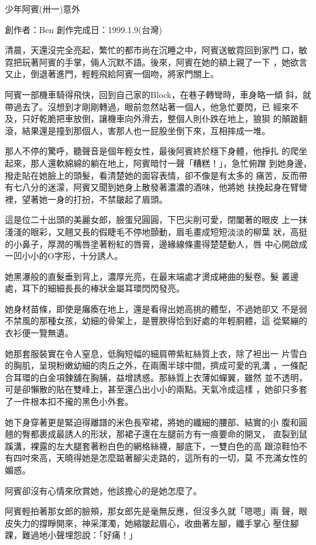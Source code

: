 



少年阿賓(卅一)意外

創作者：Ben
創作完成日：1999.1.9(台灣)


清晨，天還沒完全亮起，繁忙的都市尚在沉睡之中，阿賓送敏霓回到家門
口，敏霓把玩著阿賓的手掌，倆人沉默不語。後來，阿賓在她的額上親了一下
，她欲言又止，倒退著進門，輕輕飛給阿賓一個吻，將家門關上。

阿賓一部機車騎得飛快，回到自己家的Block，在巷子轉彎時，車身略一傾
斜，就帶過去了。沒想到才剛剛轉過，眼前忽然站著一個人，他急忙要閃，已
經來不及，只好乾脆把車放倒，讓機車向外滑去，整個人則仆跌在地上，狼狽
的顛跛翻滾，結果還是撞到那個人，害那人也一屁股坐倒下來，互相摔成一堆。

那人不停的驚呼，聽聲音是個年輕女性，最後阿賓終於穩下身體，他掙扎
的爬坐起來，那人還軟綿綿的躺在地上，阿賓暗忖一聲「糟糕！」，急忙俯蹭
到她身邊，撥走貼在她臉上的頭髮，看清楚她的面容表情，卻不像是有太多的
痛苦，反而帶有七八分的迷濛，阿賓又聞到她身上散發著濃濃的酒味，他將她
扶挽起身在臂彎裡，望著她一身的打扮，不禁皺起了眉頭。

這是位二十出頭的美麗女郎，臉蛋兒圓圓，下巴尖削可愛，閉闔著的眼皮
上一抹淺淺的眼彩，又翹又長的假睫毛不停地顫動，眉毛畫成短短淡淡的柳葉
狀，高挺的小鼻子，厚潤的嘴唇塗著粉紅的唇膏，邊緣線條畫得楚楚動人，唇
中心開啟成一凹小小的O字形，十分誘人。

她黑瀑般的直髮垂到背上，濃厚光亮，在最末端處才燙成綣曲的髮卷。髮
叢邊處，耳下的細細長長的棒狀金屬耳環閃閃發亮。

她身材苗條，即使是癱瘓在地上，還是看得出她高挑的體型，不過她卻又
不是弱不禁風的那種女孩，幼細的骨架上，是豐腴得恰到好處的年輕胴體，這
從緊繃的衣衫便一覽無遺。

她那套服裝實在令人窒息，低胸短幅的細肩帶紫紅絲質上衣，除了袒出一
片雪白的胸肌，呈現粉嫩幼細的肉丘之外，在兩團半球中間，擠成可愛的乳溝
，一條配合耳環的白金項鍊舖在胸脯，益增誘惑。那絲質上衣薄如蟬翼，雖然
並不透明，可是卻懶散的貼在雙峰上，甚至還凸出小小的兩點。天氣冷成這樣
，她卻只多套了一件根本扣不攏的黑色小外套。

她下身穿著更是緊迫得離譜的米色長窄裙，將她的纖細的腰部、結實的小
腹和圓翹的臀都裹成最誘人的形狀，那裙子還在左腿前方有一痕要命的開叉，
直裂到鼠蹊溝，裸露的左大腿套著粉白色的網格絲襪，腳底下，一雙白色的高
跟涼鞋怕不有四吋來高，天曉得她是怎麼踮著腳尖走路的，這所有的一切，莫
不充滿女性的媚惑。

阿賓卻沒有心情來欣賞她，他該擔心的是她怎麼了。

阿賓輕拍著那女郎的臉頰，那女郎先是毫無反應，但沒多久就「嗯嗯」兩
聲，眼皮失力的撐睜開來，神采渾濁，她縮皺起眉心，收曲著左腳，纖手掌心
壓住腳踝，難過地小聲埋怨說：「好痛！」

